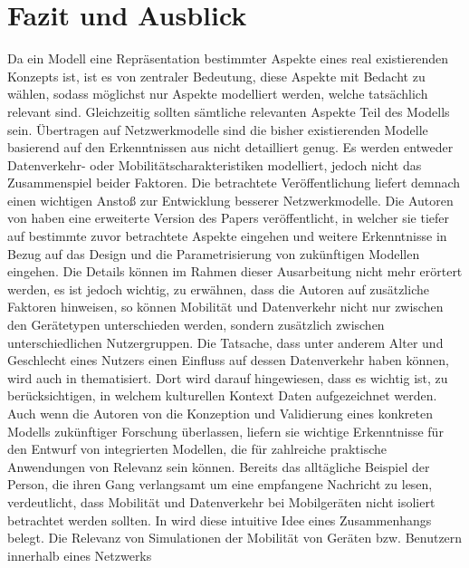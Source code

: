 \documentclass[12pt, a4paper]{article}
\begin{document}
\section{Fazit und Ausblick}
\label{sec:conclusion}

Da ein Modell eine Repräsentation bestimmter Aspekte eines real existierenden Konzepts ist,
ist es von zentraler Bedeutung, diese Aspekte mit Bedacht zu wählen, sodass möglichst nur
Aspekte modelliert werden, welche tatsächlich relevant sind. Gleichzeitig sollten sämtliche relevanten
Aspekte Teil des Modells sein. Übertragen auf Netzwerkmodelle sind die bisher existierenden Modelle
basierend auf den Erkenntnissen aus \cite{Alipour2018} nicht detailliert genug. Es werden entweder
Datenverkehr- oder Mobilitätscharakteristiken modelliert, jedoch nicht das Zusammenspiel beider Faktoren.
Die betrachtete Veröffentlichung liefert demnach einen wichtigen Anstoß zur Entwicklung besserer Netzwerkmodelle.
Die Autoren von \cite{Alipour2018} haben eine erweiterte Version des Papers veröffentlicht,
in welcher sie tiefer auf bestimmte zuvor betrachtete Aspekte eingehen und weitere Erkenntnisse in Bezug
auf das Design und die Parametrisierung von zukünftigen Modellen eingehen.
Die Details können im Rahmen dieser Ausarbeitung nicht mehr erörtert werden, es ist jedoch wichtig, zu erwähnen,
dass die Autoren auf zusätzliche Faktoren hinweisen, so können Mobilität und Datenverkehr nicht nur
zwischen den Gerätetypen unterschieden werden, sondern zusätzlich zwischen unterschiedlichen Nutzergruppen.
Die Tatsache, dass unter anderem Alter und Geschlecht eines Nutzers einen Einfluss auf dessen Datenverkehr haben können,
wird auch in \cite{Oliveira2014} thematisiert. Dort wird darauf hingewiesen, dass es wichtig ist,
zu berücksichtigen, in welchem kulturellen Kontext Daten aufgezeichnet werden.\newline
Auch wenn die Autoren von \cite{Alipour2018} die Konzeption und Validierung eines konkreten Modells
zukünftiger Forschung überlassen, liefern sie wichtige Erkenntnisse für den Entwurf von integrierten Modellen,
die für zahlreiche praktische Anwendungen von Relevanz sein können.
Bereits das alltägliche Beispiel der Person, die ihren Gang verlangsamt um eine empfangene Nachricht zu lesen,
verdeutlicht, dass Mobilität und Datenverkehr bei Mobilgeräten nicht isoliert betrachtet werden sollten.
In \cite{Alipour2018} wird diese intuitive Idee eines Zusammenhangs belegt.\newline
Die Relevanz von Simulationen der Mobilität von Geräten bzw. Benutzern innerhalb eines Netzwerks
\end{document}
